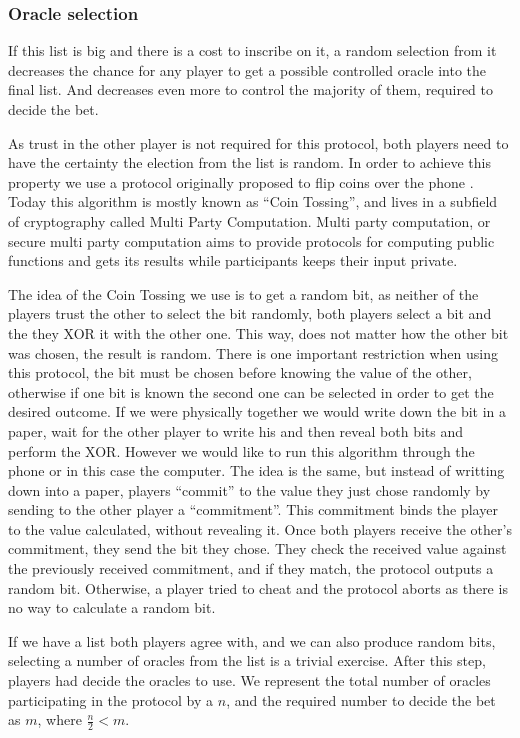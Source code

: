 \subsubsection{Oracle selection}

If this list is big and there is a cost to inscribe on it, a random selection
  from it decreases the chance for any player to get a possible controlled
  oracle into the final list.
And decreases even more to control the majority of them, required to decide
  the bet.

As trust in the other player is not required for this protocol, both players
need to have the certainty the election from the list is random.
In order to achieve this property we use a protocol originally proposed to flip
  coins over the phone \cite{blum1983coin}.
Today this algorithm is mostly known as ``Coin Tossing'', and lives in a
  subfield of cryptography called Multi Party Computation.
Multi party computation, or secure multi party computation aims to provide
  protocols for computing public functions and gets its results while
  participants keeps their input private.

The idea of the Coin Tossing we use is to get a random bit, as neither of the
  players trust the other to select the bit randomly, both players select a bit
  and the they XOR it with the other one.
This way, does not matter how the other bit was chosen, the result is random.
There is one important restriction when using this protocol, the bit must be
  chosen before knowing the value of  the other, otherwise if one bit is known
  the second one can be selected in order to get the desired outcome.
If we were physically together we would write down the bit in a paper, wait for
  the other player to write his and then reveal both bits and perform the XOR\@.
However we would like to run this algorithm through the phone or in this case
  the computer.
The idea is the same, but instead of writting down into a paper, players
  ``commit'' to the value they just chose randomly by sending to the other
  player a ``commitment''.
This commitment binds the player to the value calculated, without revealing it.
Once both players receive the other's commitment, they send the bit they chose.
They check the received value against the previously received commitment, and if
  they match, the protocol outputs a random bit.
Otherwise, a player tried to cheat and the protocol aborts as there is no way to
  calculate a random bit.

If we have a list both players agree with, and we can also produce random bits,
  selecting a number of oracles from the list is a trivial exercise.
After this step, players had decide the oracles to use.
We represent the total number of oracles participating in the protocol by a $n$,
  and the required number to decide the bet as $m$, where $\frac{n}{2} < m$.

